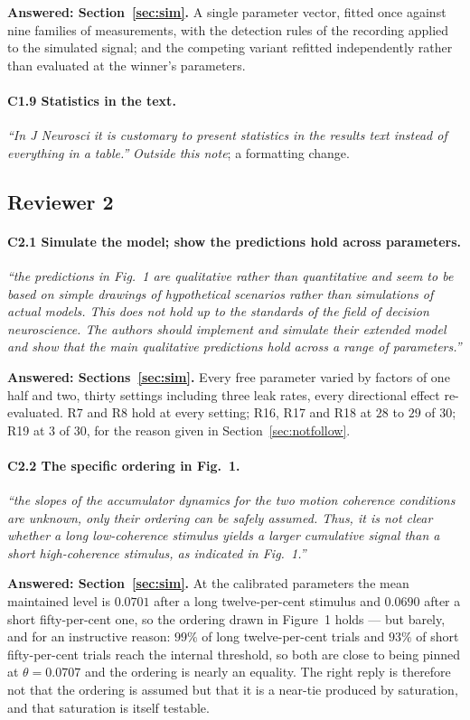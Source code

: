 \documentclass[a4paper,11pt]{article}
\newcommand{\1}{\mathbbm{1}}
\begin{document}
\textbf{Answered: Section~\ref{sec:sim}.} A single parameter vector, fitted once against
nine families of measurements, with the detection rules of the recording applied to the
simulated signal; and the competing variant refitted independently rather than evaluated
at the winner's parameters.

\paragraph{C1.9 Statistics in the text.}
\emph{``In J Neurosci it is customary to present statistics in the results text instead
of everything in a table.''} \emph{Outside this note}; a formatting change.

\subsection{Reviewer 2}

\paragraph{C2.1 Simulate the model; show the predictions hold across parameters.}
\emph{``the predictions in Fig.~1 are qualitative rather than quantitative and seem to
be based on simple drawings of hypothetical scenarios rather than simulations of actual
models. This does not hold up to the standards of the field of decision neuroscience.
The authors should implement and simulate their extended model and show that the main
qualitative predictions hold across a range of parameters.''}

\textbf{Answered: Sections~\ref{sec:sim}.} Every free parameter varied by factors of
one half and two, thirty settings including three leak rates, every directional effect
re-evaluated. R7 and R8 hold at every setting; R16, R17 and R18 at $28$ to $29$ of
$30$; R19 at $3$ of $30$, for the reason given in Section~\ref{sec:notfollow}.

\paragraph{C2.2 The specific ordering in Fig.~1.}
\emph{``the slopes of the accumulator dynamics for the two motion coherence conditions
are unknown, only their ordering can be safely assumed. Thus, it is not clear whether a
long low-coherence stimulus yields a larger cumulative signal than a short
high-coherence stimulus, as indicated in Fig.~1.''}

\textbf{Answered: Section~\ref{sec:sim}.} At the calibrated parameters the mean
maintained level is $0.0701$ after a long twelve-per-cent stimulus and $0.0690$ after a
short fifty-per-cent one, so the ordering drawn in Figure~1 holds --- but barely, and
for an instructive reason: $99\%$ of long twelve-per-cent trials and $93\%$ of short
fifty-per-cent trials reach the internal threshold, so both are close to being pinned at
$\theta=0.0707$ and the ordering is nearly an equality. The right reply is therefore not
that the ordering is assumed but that it is a near-tie produced by saturation, and that
saturation is itself testable.
\end{document}
